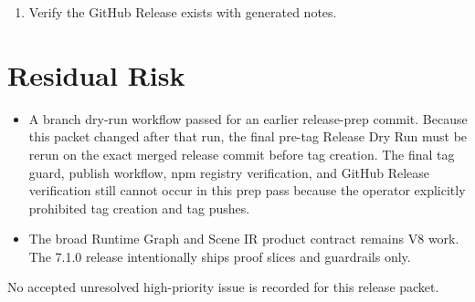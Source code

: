 \begin{enumerate}
\texttt{@\allowbreak{}f\allowbreak{}l\allowbreak{}y\allowbreak{}i\allowbreak{}n\allowbreak{}g\allowbreak{}r\allowbreak{}o\allowbreak{}b\allowbreak{}o\allowbreak{}t\allowbreak{}s\allowbreak{}/\allowbreak{}b\allowbreak{}i\allowbreak{}j\allowbreak{}o\allowbreak{}u\allowbreak{}-\allowbreak{}i\allowbreak{}1\allowbreak{}8\allowbreak{}n\allowbreak{}-\allowbreak{}t\allowbreak{}o\allowbreak{}o\allowbreak{}l\allowbreak{}s\allowbreak{}-\allowbreak{}x\allowbreak{}l\allowbreak{}s\allowbreak{}x}, and \texttt{@\allowbreak{}f\allowbreak{}l\allowbreak{}y\allowbreak{}i\allowbreak{}n\allowbreak{}g\allowbreak{}r\allowbreak{}o\allowbreak{}b\allowbreak{}o\allowbreak{}t\allowbreak{}s\allowbreak{}/\allowbreak{}b\allowbreak{}i\allowbreak{}j\allowbreak{}o\allowbreak{}u\allowbreak{}-\allowbreak{}m\allowbreak{}c\allowbreak{}p}.
\item
  Verify the GitHub Release exists with generated notes.
\end{enumerate}

\section{Residual Risk}\label{record-260-residual-risk}

\begin{itemize}
\tightlist
\item
  A branch dry-run workflow passed for an earlier release-prep commit. Because this packet changed after that run, the final pre-tag Release Dry Run must be rerun on the exact merged release commit before tag creation. The final tag guard, publish workflow, npm registry verification, and GitHub Release verification still cannot occur in this prep pass because the operator explicitly prohibited tag creation and tag pushes.
\item
  The broad Runtime Graph and Scene IR product contract remains V8 work. The 7.1.0 release intentionally ships proof slices and guardrails only.
\end{itemize}

No accepted unresolved high-priority issue is recorded for this release packet.

